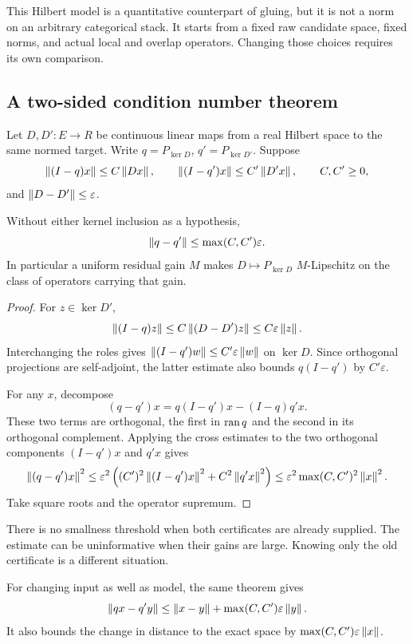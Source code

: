 This Hilbert model is a quantitative counterpart of gluing, but it is not a norm on an arbitrary categorical stack. It starts from a fixed raw candidate space, fixed norms, and actual local and overlap operators. Changing those choices requires its own comparison.

\label{sec:motion}
\subsection{A two-sided condition number theorem}
Let \(D,D':E\to R\) be continuous linear maps from a real Hilbert space to the same normed target. Write \(q=P_{\ker D}\), \(q'=P_{\ker D'}\). Suppose
\[
 \left\lVert(I-q)x\right\rVert\le C\left\lVert Dx\right\rVert,\qquad
 \left\lVert(I-q')x\right\rVert\le C'\left\lVert D'x\right\rVert,\qquad C,C'\ge0,
\]
and \(\left\lVert D-D'\right\rVert\le\varepsilon\).

\begin{theorem}\label{KS48}
Without either kernel inclusion as a hypothesis,
\begin{equation}\label{eq:motion}
 \left\lVert q-q'\right\rVert\le\max(C,C')\varepsilon.
\end{equation}
In particular a uniform residual gain \(M\) makes \(D\mapsto P_{\ker D}\) \(M\)-Lipschitz on the class of operators carrying that gain.
\end{theorem}
\begin{proof}
For \(z\in\ker D'\),
\[
 \left\lVert(I-q)z\right\rVert\le C\left\lVert(D-D')z\right\rVert\le C\varepsilon\left\lVert z\right\rVert.
\]
Interchanging the roles gives \(\left\lVert(I-q')w\right\rVert\le C'\varepsilon\left\lVert w\right\rVert\) on \(\ker D\). Since orthogonal projections are self-adjoint, the latter estimate also bounds \(q(I-q')\) by \(C'\varepsilon\).

For any \(x\), decompose
\[
 (q-q')x=q(I-q')x-(I-q)q'x.
\]
These two terms are orthogonal, the first in \(\operatorname{ran} q\) and the second in its orthogonal complement. Applying the cross estimates to the two orthogonal components \((I-q')x\) and \(q'x\) gives
\[
 \left\lVert(q-q')x\right\rVert^2
 \le\varepsilon^2\left((C')^2\left\lVert(I-q')x\right\rVert^2+C^2\left\lVert q'x\right\rVert^2\right)
 \le\varepsilon^2\max(C,C')^2\left\lVert x\right\rVert^2.
\]
Take square roots and the operator supremum.
\end{proof}
There is no smallness threshold when both certificates are already supplied. The estimate can be uninformative when their gains are large. Knowing only the old certificate is a different situation.

For changing input as well as model, the same theorem gives
\[
 \left\lVert qx-q'y\right\rVert\le\left\lVert x-y\right\rVert+\max(C,C')\varepsilon\left\lVert y\right\rVert.
\]
It also bounds the change in distance to the exact space by \(\max(C,C')\varepsilon\left\lVert x\right\rVert\).

